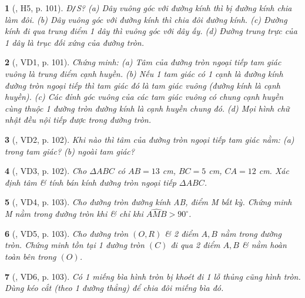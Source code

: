 \documentclass{article}
\newtheorem{baitoan}{}
\begin{document}
\begin{baitoan}[\cite{Binh_boi_duong_Toan_9_tap_1}, H5, p. 101]
	{\rm Đ{\tt/}S?} (a) Dây vuông góc với đường kính thì bị đường kính chia làm đôi. (b) Dây vuông góc với đường kính thì chia đôi đường kính. (c) Đường kính đi qua trung điểm 1 dây thì vuông góc với dây ấy. (d) Đường trung trực của 1 dây là trục đối xứng của đường tròn.
\end{baitoan}

\begin{baitoan}[\cite{Binh_boi_duong_Toan_9_tap_1}, VD1, p. 101]
	Chứng minh: (a) Tâm của đường tròn ngoại tiếp tam giác vuông là trung điểm cạnh huyền. (b) Nếu 1 tam giác có 1 cạnh là đường kính đường tròn ngoại tiếp thì tam giác đó là tam giác vuông (đường kính là cạnh huyền). (c) Các đỉnh góc vuông của các tam giác vuông có chung cạnh huyền cùng thuộc 1 đường tròn đường kính là cạnh huyền chung đó. (d) Mọi hình chữ nhật đều nội tiếp được trong đường tròn.
\end{baitoan}

\begin{baitoan}[\cite{Binh_boi_duong_Toan_9_tap_1}, VD2, p. 102]
	Khi nào thì tâm của đường tròn ngoại tiếp tam giác nằm: (a) trong tam giác? (b) ngoài tam giác?
\end{baitoan}

\begin{baitoan}[\cite{Binh_boi_duong_Toan_9_tap_1}, VD3, p. 102]
	Cho $\Delta ABC$ có $AB = 13$ {\rm cm}, $BC = 5$ {\rm cm}, $CA = 12$ {\rm cm}. Xác định tâm \& tính bán kính đường tròn ngoại tiếp $\Delta ABC$.
\end{baitoan}

\begin{baitoan}[\cite{Binh_boi_duong_Toan_9_tap_1}, VD4, p. 103]
	Cho đường tròn đường kính AB, điểm M bất kỳ. Chứng minh M nằm trong đường tròn khi \& chỉ khi $\widehat{AMB} > 90^\circ$.
\end{baitoan}

\begin{baitoan}[\cite{Binh_boi_duong_Toan_9_tap_1}, VD5, p. 103]
	Cho đường tròn $(O,R)$ \& 2 điểm $A,B$ nằm trong đường tròn. Chứng minh tồn tại 1 đường tròn $(C)$ đi qua 2 điểm $A,B$ \& nằm hoàn toàn bên trong $(O)$.
\end{baitoan}

\begin{baitoan}[\cite{Binh_boi_duong_Toan_9_tap_1}, VD6, p. 103]
	Có 1 miếng bìa hình tròn bị khoét đi 1 lỗ thủng cũng hình tròn. Dùng kéo cắt (theo 1 đường thẳng) để chia đôi miếng bìa đó.
\end{baitoan}
\end{document}
